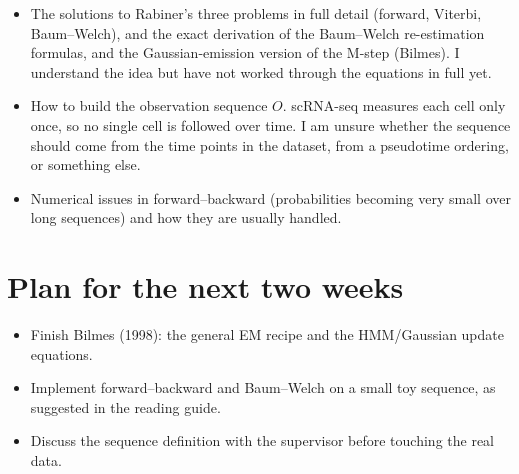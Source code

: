 \documentclass[10pt,a4paper]{article}
\begin{document}
\begin{itemize}
  \item The solutions to Rabiner's three problems in full detail (forward, Viterbi, Baum--Welch), and the exact derivation of the Baum--Welch re-estimation formulas, and the Gaussian-emission version of the M-step (Bilmes). I understand the idea but have not worked through the equations in full yet.
  \item How to build the observation sequence $O$. scRNA-seq measures each cell only once, so no single cell is followed over time. I am unsure whether the sequence should come from the time points in the dataset, from a pseudotime ordering, or something else.
  \item Numerical issues in forward--backward (probabilities becoming very small over long sequences) and how they are usually handled.
\end{itemize}

\section{Plan for the next two weeks}

\begin{itemize}
  \item Finish Bilmes (1998): the general EM recipe and the HMM/Gaussian update equations.
  \item Implement forward--backward and Baum--Welch on a small toy sequence, as suggested in the reading guide.
  \item Discuss the sequence definition with the supervisor before touching the real data.
\end{itemize}
\end{document}
